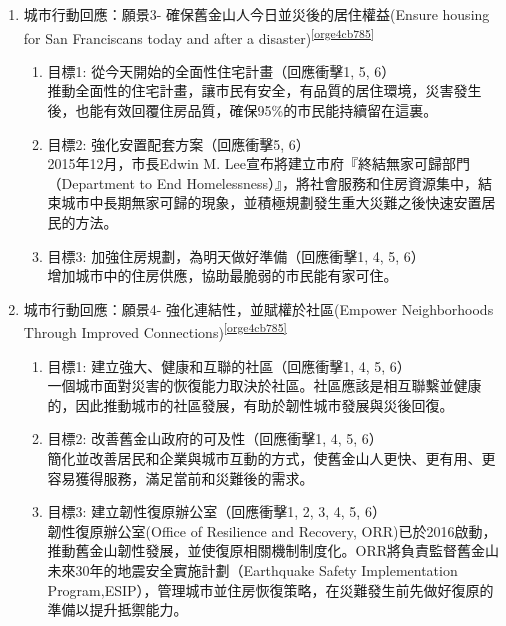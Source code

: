 \documentclass[a4paper,12pt]{article}
\begin{document}
\begin{enumerate}
\begin{enumerate}
\item 城市行動回應：願景3- 確保舊金山人今日並災後的居住權益(Ensure housing for San Franciscans today and after a disaster)\textsuperscript{\ref{orge4cb785}}
\label{sec:orgc078b57}
\begin{enumerate}
\item 目標1: 從今天開始的全面性住宅計畫（回應衝擊1, 5, 6）\\
推動全面性的住宅計畫，讓市民有安全，有品質的居住環境，災害發生後，也能有效回覆住房品質，確保95\%的市民能持續留在這裏。\\
\item 目標2: 強化安置配套方案（回應衝擊5, 6）\\
2015年12月，市長Edwin M. Lee宣布將建立市府『終結無家可歸部門（Department to End Homelessness）』，將社會服務和住房資源集中，結束城市中長期無家可歸的現象，並積極規劃發生重大災難之後快速安置居民的方法。\\
\item 目標3: 加強住房規劃，為明天做好準備（回應衝擊1, 4, 5, 6）\\
增加城市中的住房供應，協助最脆弱的市民能有家可住。\\
\end{enumerate}

\item 城市行動回應：願景4- 強化連結性，並賦權於社區(Empower Neighborhoods Through Improved Connections)\textsuperscript{\ref{orge4cb785}}
\label{sec:org111304c}
\begin{enumerate}
\item 目標1: 建立強大、健康和互聯的社區（回應衝擊1, 4, 5, 6）\\
一個城市面對災害的恢復能力取決於社區。社區應該是相互聯繫並健康的，因此推動城市的社區發展，有助於韌性城市發展與災後回復。\\
\item 目標2: 改善舊金山政府的可及性（回應衝擊1, 4, 5, 6）\\
簡化並改善居民和企業與城市互動的方式，使舊金山人更快、更有用、更容易獲得服務，滿足當前和災難後的需求。\\
\item 目標3: 建立韌性復原辦公室（回應衝擊1, 2, 3, 4, 5, 6）\\
韌性復原辦公室(Office of Resilience and Recovery, ORR)已於2016啟動，推動舊金山韌性發展，並使復原相關機制制度化。ORR將負責監督舊金山未來30年的地震安全實施計劃（Earthquake Safety Implementation Program,ESIP），管理城市並住房恢復策略，在災難發生前先做好復原的準備以提升抵禦能力。\\
\end{enumerate}


\end{enumerate}
\end{enumerate}
\end{document}
